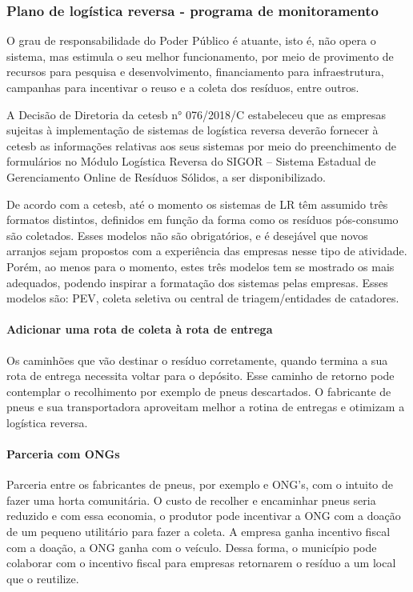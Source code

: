 \subsubsection{Plano de logística reversa - programa de monitoramento}
O grau de responsabilidade do Poder Público é atuante, isto é, não opera o sistema, mas estimula o seu melhor funcionamento, por meio de provimento de recursos para pesquisa e desenvolvimento, financiamento para infraestrutura, campanhas para incentivar o reuso e a coleta dos resíduos, entre outros.

A Decisão de Diretoria da \gls{cetesb} n° 076/2018/C estabeleceu que as empresas sujeitas à implementação de sistemas de logística reversa deverão fornecer à \gls{cetesb} as informações relativas aos seus sistemas por meio do preenchimento de formulários no Módulo Logística Reversa do SIGOR – Sistema Estadual de Gerenciamento Online de Resíduos Sólidos, a ser disponibilizado.

De acordo com a \gls{cetesb}, até o momento os sistemas de LR têm assumido três formatos distintos, definidos em função da forma como os resíduos pós-consumo são coletados. Esses modelos não são obrigatórios, e é desejável que novos arranjos sejam propostos com a experiência das empresas nesse tipo de atividade. Porém, ao menos para o momento, estes três modelos tem se mostrado os mais adequados, podendo inspirar a formatação dos sistemas pelas empresas. Esses modelos são: PEV, coleta seletiva ou central de triagem/entidades de catadores. 

\paragraph{\textbf{Adicionar uma rota de coleta à rota de entrega}}
Os caminhões que vão destinar o resíduo corretamente, quando termina a sua rota de entrega necessita voltar para o depósito. Esse caminho de retorno pode contemplar o recolhimento por exemplo de pneus descartados. O fabricante de pneus e sua transportadora aproveitam melhor a rotina de entregas e otimizam a logística reversa.


\paragraph{\textbf{Parceria com ONGs}}
Parceria entre os fabricantes de pneus, por exemplo e ONG’s, com o intuito de fazer uma horta comunitária. O custo de recolher e encaminhar pneus seria reduzido e com essa economia, o produtor pode incentivar a ONG com a doação de um pequeno utilitário para fazer a coleta. A empresa ganha incentivo fiscal com a doação, a ONG ganha com o veículo. Dessa forma, o município pode colaborar com o incentivo fiscal para empresas retornarem o resíduo a um local que o reutilize.

